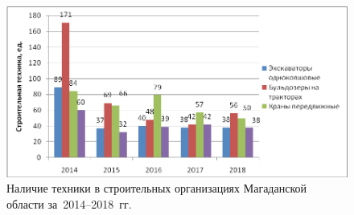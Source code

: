 \begin{figure}[h!]

  \begin{center}
    \includegraphics[width=1\textwidth]{authors/serebryakova-fig-4.png}
  \end{center}

  \caption{Наличие техники в строительных организациях Магаданской области
за~2014--2018~гг.}
  \label{fig:serebryakova-fig-4}
\end{figure}
